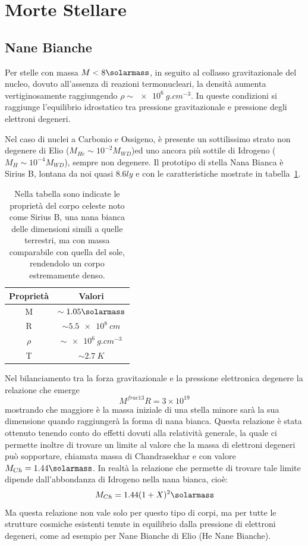 \section{Morte Stellare}\label{sec:morte-stellare}
\subsection{Nane Bianche}\label{sec:nane-bianche}
Per stelle con massa $M < 8\si{\solarmass}$, in seguito al collasso gravitazionale del nucleo, dovuto all'assenza di reazioni termonucleari, la densità aumenta vertiginosamente raggiungendo $\rho \sim \SI{e6}{g.cm^{-3}}$. In queste condizioni si raggiunge l'equilibrio idrostatico tra pressione gravitazionale e pressione degli elettroni degeneri.

Nel caso di nuclei a Carbonio e Ossigeno, è presente un sottilissimo strato non degenere di Elio ($M_{He} \sim 10^{-2} M_{WD}$)ed uno ancora più sottile di Idrogeno ($M_{H} \sim 10^{-4} M_{WD}$), sempre non degenere. Il prototipo di stella Nana Bianca è Sirius B, lontana da noi quasi $8.6 \si{ly}$ e con le caratteristiche mostrate in tabella~\ref{tab:sirius-b}.

\begin{table}
    \centering
    \caption{Nella tabella sono indicate le proprietà del corpo celeste noto come Sirius B, una nana bianca delle dimensioni simili a quelle terrestri, ma con massa comparabile con quella del sole, rendendolo un corpo estremamente denso.}\label{tab:sirius-b}
    \begin{tabular}{c|c}
        \toprule
        Proprietà & Valori\\
        \midrule
        M & $\sim 1.05 \si{\solarmass}$\\
        R & $\sim \SI{5.5 e8}{cm}$\\
        $\rho$ & $\sim \SI{e6}{g.cm^{-3}}$\\
        T & $\sim \SI{2.7}{K}$\\
        \bottomrule
    \end{tabular}
\end{table}

Nel bilanciamento tra la forza gravitazionale e la pressione elettronica degenere la relazione che emerge
\[
    M^{frac{1}{3}}R = 3\times 10^{19}
\]
mostrando che maggiore è la massa iniziale di una stella minore sarà la sua dimensione quando raggiungerà la forma di nana bianca. Questa relazione è stata ottenuto tenendo conto do effetti dovuti alla relatività generale, la quale ci permette inoltre di trovare un limite al valore che la massa di elettroni degeneri può sopportare, chiamata massa di Chandrasekhar e con valore $M_{Ch} = 1.44\si{\solarmass}$. In realtà la relazione che permette di trovare tale limite dipende dall'abbondanza di Idrogeno nella nana bianca, cioè:
\[
    M_{Ch} = 1.44(1+X)^2 \si{\solarmass}
\]
Ma questa relazione non vale solo per questo tipo di corpi, ma per tutte le strutture cosmiche esistenti tenute in equilibrio dalla pressione di elettroni degeneri, come ad esempio per Nane Bianche di Elio (He Nane Bianche).

